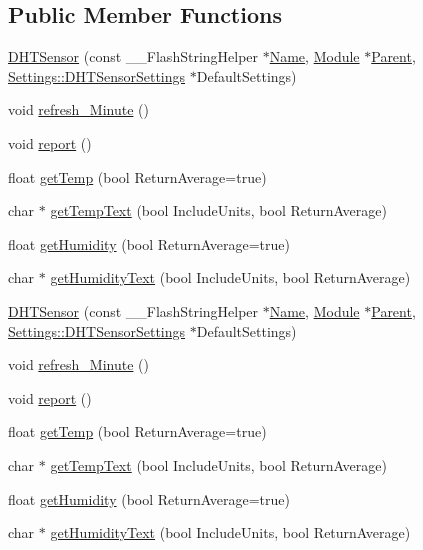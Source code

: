\subsection*{Public Member Functions}
\begin{DoxyCompactItemize}
\item 
\hyperlink{class_d_h_t_sensor_a75c40cadfc569af7abf80b2cb557b296}{D\+H\+T\+Sensor} (const \+\_\+\+\_\+\+Flash\+String\+Helper $\ast$\hyperlink{class_common_aeea91a726dbe988e515057b32ba0726f}{Name}, \hyperlink{class_module}{Module} $\ast$\hyperlink{class_d_h_t_sensor_a874672c28d4f4ff9272194c0947c59e6}{Parent}, \hyperlink{struct_settings_1_1_d_h_t_sensor_settings}{Settings\+::\+D\+H\+T\+Sensor\+Settings} $\ast$Default\+Settings)
\item 
void \hyperlink{class_d_h_t_sensor_a7e939e9b6e2e2910a67b98d820e9e552}{refresh\+\_\+\+Minute} ()
\item 
void \hyperlink{class_d_h_t_sensor_a2ef11882c3401c097b7a08e4b35eb103}{report} ()
\item 
float \hyperlink{class_d_h_t_sensor_acd945543fd907dfd5dd6c1dcd4612af1}{get\+Temp} (bool Return\+Average=true)
\item 
char $\ast$ \hyperlink{class_d_h_t_sensor_ae2091b0774bf7504477c469efd053631}{get\+Temp\+Text} (bool Include\+Units, bool Return\+Average)
\item 
float \hyperlink{class_d_h_t_sensor_a522c1a47a86f3908581ff283ca3c61ec}{get\+Humidity} (bool Return\+Average=true)
\item 
char $\ast$ \hyperlink{class_d_h_t_sensor_a795e7b88ea1b141213f7781d40cca458}{get\+Humidity\+Text} (bool Include\+Units, bool Return\+Average)
\item 
\hyperlink{class_d_h_t_sensor_a75c40cadfc569af7abf80b2cb557b296}{D\+H\+T\+Sensor} (const \+\_\+\+\_\+\+Flash\+String\+Helper $\ast$\hyperlink{class_common_aeea91a726dbe988e515057b32ba0726f}{Name}, \hyperlink{class_module}{Module} $\ast$\hyperlink{class_d_h_t_sensor_a874672c28d4f4ff9272194c0947c59e6}{Parent}, \hyperlink{struct_settings_1_1_d_h_t_sensor_settings}{Settings\+::\+D\+H\+T\+Sensor\+Settings} $\ast$Default\+Settings)
\item 
void \hyperlink{class_d_h_t_sensor_a7e939e9b6e2e2910a67b98d820e9e552}{refresh\+\_\+\+Minute} ()
\item 
void \hyperlink{class_d_h_t_sensor_a2ef11882c3401c097b7a08e4b35eb103}{report} ()
\item 
float \hyperlink{class_d_h_t_sensor_acd945543fd907dfd5dd6c1dcd4612af1}{get\+Temp} (bool Return\+Average=true)
\item 
char $\ast$ \hyperlink{class_d_h_t_sensor_a7b53fb890dd45e04dec5dfe6d9207608}{get\+Temp\+Text} (bool Include\+Units, bool Return\+Average)
\item 
float \hyperlink{class_d_h_t_sensor_a522c1a47a86f3908581ff283ca3c61ec}{get\+Humidity} (bool Return\+Average=true)
\item 
char $\ast$ \hyperlink{class_d_h_t_sensor_a20d8ef72e8d9fdbd6c6747cfd70f8fa2}{get\+Humidity\+Text} (bool Include\+Units, bool Return\+Average)
\end{DoxyCompactItemize}
